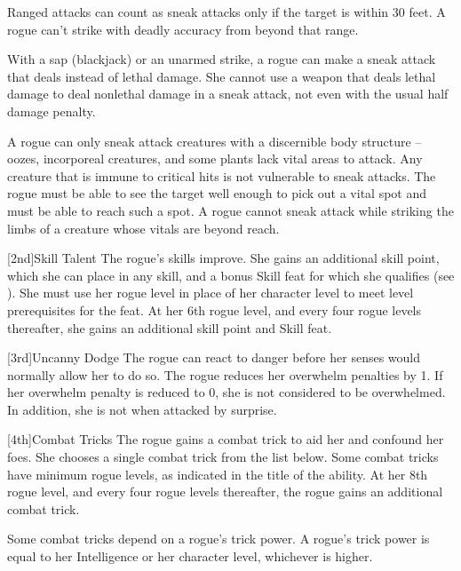         \par Ranged attacks can count as sneak attacks only if the target is within 30 feet.
        A rogue can't strike with deadly accuracy from beyond that range.

        With a sap (blackjack) or an unarmed strike, a rogue can make a sneak attack that deals  instead of lethal damage.
        She cannot use a weapon that deals lethal damage to deal nonlethal damage in a sneak attack, not even with the usual half damage penalty.

        A rogue can only sneak attack creatures with a discernible body structure -- oozes, incorporeal creatures, and some plants lack vital areas to attack.
        Any creature that is immune to critical hits is not vulnerable to sneak attacks.
        The rogue must be able to see the target well enough to pick out a vital spot and must be able to reach such a spot.
        A rogue cannot sneak attack while striking the limbs of a creature whose vitals are beyond reach.

        [2nd]{Skill Talent}
        The rogue's skills improve.
        She gains an additional skill point, which she can place in any skill, and a bonus Skill feat for which she qualifies (see ).
        She must use her rogue level in place of her character level to meet level prerequisites for the feat.
        At her 6th rogue level, and every four rogue levels thereafter, she gains an additional skill point and Skill feat.

        [3rd]{Uncanny Dodge}
        The rogue can react to danger before her senses would normally allow her to do so.
        The rogue reduces her overwhelm penalties by 1.
        If her overwhelm penalty is reduced to 0, she is not considered to be overwhelmed.
        In addition, she is not \unaware when attacked by surprise.

        [4th]{Combat Tricks}
        The rogue gains a combat trick to aid her and confound her foes.
        She chooses a single combat trick from the list below.
        Some combat tricks have minimum rogue levels, as indicated in the title of the ability.
        At her 8th rogue level, and every four rogue levels thereafter, the rogue gains an additional combat trick.

        Some combat tricks depend on a rogue's trick power.
        A rogue's trick power is equal to her Intelligence or her character level, whichever is higher.

